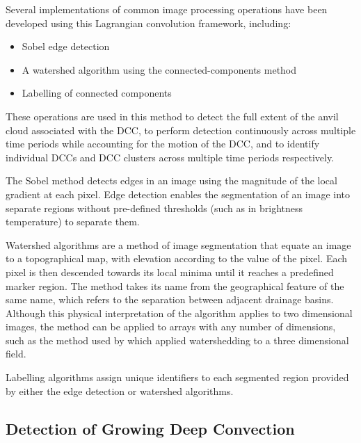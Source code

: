 \documentclass[amt, manuscript]{copernicus}
\begin{document}
Several implementations of common image processing operations have been developed using this Lagrangian convolution framework, including:
\begin{itemize}
    \item Sobel edge detection \citep{sobel_isotropic_2014}
    \item A watershed algorithm using the connected-components method \citep{bieniek_efficient_2000}
    \item Labelling of connected components \citep{hoshen_percolation_1976}
\end{itemize}

These operations are used in this method to detect the full extent of the anvil cloud associated with the DCC, to perform detection continuously across multiple time periods while accounting for the motion of the DCC, and to identify individual DCCs and DCC clusters across multiple time periods respectively.

The Sobel method detects edges in an image using the magnitude of the local gradient at each pixel.
Edge detection enables the segmentation of an image into separate regions without pre-defined thresholds (such as in brightness temperature) to separate them.

Watershed algorithms are a method of image segmentation that equate an image to a topographical map, with elevation according to the value of the pixel.
Each pixel is then descended towards its local minima until it reaches a predefined marker region.
The method takes its name from the geographical feature of the same name, which refers to the separation between adjacent drainage basins.
Although this physical interpretation of the algorithm applies to two dimensional images, the method can be applied to arrays with any number of dimensions, such as the method used by \citet{fiolleau_algorithm_2013} which applied watershedding to a three dimensional field.

Labelling algorithms assign unique identifiers to each segmented region provided by either the edge detection or watershed algorithms.

\subsection{Detection of Growing Deep Convection}
\end{document}
